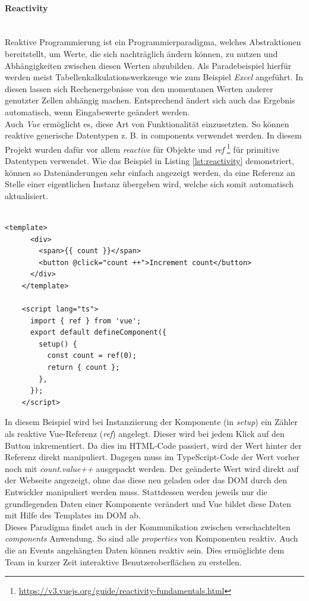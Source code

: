 \documentclass[10pt, a4paper]{article}
\begin{document}
\begin{onehalfspace}
  \paragraph*{Reactivity}$~$ \\
  Reaktive Programmierung ist ein Programmierparadigma, welches Abstraktionen bereitstellt,
  um Werte, die sich nachträglich ändern können, zu nutzen
  und Abhängigkeiten zwischen diesen Werten abzubilden. \cite{ReactiveProgramming}
  Als Paradebeispiel hierfür werden meist Tabellenkalkulationswerkzeuge wie zum Beispiel \textit{Excel} angeführt.
  In diesen lassen sich Rechenergebnisse von den momentanen Werten anderer genutzter Zellen abhängig machen.
  Entsprechend ändert sich auch das Ergebnis automatisch, wenn Eingabewerte geändert werden. \\
  Auch \textit{Vue} ermöglicht es, diese Art von Funktionalität einzusetzten.
  So können reaktive generische Datentypen z. B. in components verwendet werden.
  In diesem Projekt wurden dafür vor allem \textit{reactive} für Objekte und \textit{ref}
    \footnote{\raggedright\url{https://v3.vuejs.org/guide/reactivity-fundamentals.html}} für primitive Datentypen verwendet.
  Wie das Beispiel in Listing \ref{lst:reactivity} demonstriert, können so Datenänderungen sehr einfach angezeigt werden, da eine Referenz an Stelle einer eigentlichen Instanz übergeben wird, welche sich somit automatisch aktualisiert.
  \\~\\
  \begin{minipage}{\textwidth}
    \begin{lstlisting}[caption={Demonstration reaktivier Vue-Referenzen}, captionpos=b, label=lst:reactivity]
      <template>
      <div>
        <span>{{ count }}</span>
        <button @click="count ++">Increment count</button>
      </div>
    </template>

    <script lang="ts">
      import { ref } from 'vue';
      export default defineComponent({
        setup() {
          const count = ref(0);
          return { count };
        },
      });
    </script>
    \end{lstlisting}
  \end{minipage}
  In diesem Beispiel wird bei Instanziierung der Komponente (in \textit{setup}) ein Zähler als reaktive Vue-Referenz (\textit{ref}) angelegt.
  Dieser wird bei jedem Klick auf den Button inkrementiert.
  Da dies im HTML-Code passiert, wird der Wert hinter der Referenz direkt manipuliert.
  Dagegen muss im TypeScript-Code der Wert vorher noch mit \textit{count.value++} \glqq ausgepackt\grqq{} werden.
  Der geänderte Wert wird direkt auf der Webseite angezeigt,
  ohne das diese neu geladen oder das DOM durch den Entwickler manipuliert werden muss. Stattdessen werden jeweils nur die grundlegenden Daten einer Komponente verändert und Vue bildet diese Daten mit Hilfe des Templates im DOM ab.
  \\
  Dieses Paradigma findet auch in der Kommunikation zwischen verschachtelten \textit{components} Anwendung.
  So sind alle \textit{properties} von Komponenten reaktiv. Auch die an Events angehängten Daten können reaktiv sein.
  Dies ermöglichte dem Team in kurzer Zeit interaktive Benutzeroberflächen zu erstellen.


\end{onehalfspace}
\end{document}
